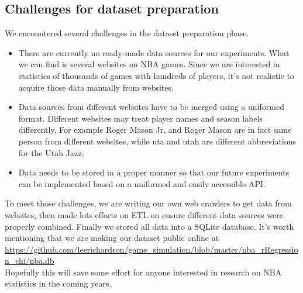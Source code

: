 \documentclass{article} %
\begin{document}
\subsection{Challenges for dataset preparation}
We encountered several challenges in the dataset preparation phase.

\begin{itemize}
\item There are currently no ready-made data sources for our experiments. What we can find is several websites on NBA games. Since we are interested in statistics of thousands of games with hundreds of players, it's not realistic to acquire those data manually from websites.
\item Data sources from different websites have to be merged using a uniformed format. Different websites may treat player names and season labels differently. For example Roger Mason Jr. and Roger Mason are in fact same person from different websites, while uta and utah are different abbreviations for the Utah Jazz.
\item Data needs to be stored in a proper manner so that our future experiments can be implemented based on a uniformed and easily accessible API.
\end{itemize}

To meet those challenges, we are writing our own web crawlers to get data from websites, then made lots efforts on ETL on ensure different data sources were properly combined. Finally we stored all data into a SQLite database.
It's worth mentioning that we are making our dataset public online at \\
\url{https://github.com/leerichardson/game_simulation/blob/master/nba_rRegression_chi/nba.db}\\
Hopefully this will save some effort for anyone interested in research on NBA statistics in the coming years. \\
\end{document}
